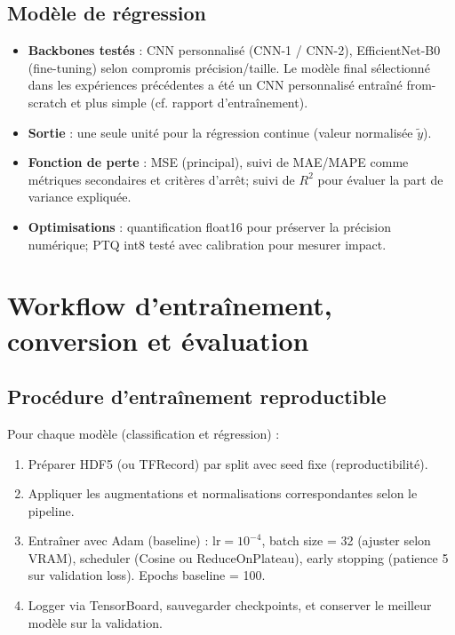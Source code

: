 \subsection{Modèle de régression}

\begin{itemize}
	\item \textbf{Backbones testés} : CNN personnalisé (CNN-1 / CNN-2), EfficientNet-B0 (fine-tuning) selon compromis précision/taille. Le modèle final sélectionné dans les expériences précédentes a été un CNN personnalisé entraîné from-scratch et plus simple (cf. rapport d'entraînement).
	\item \textbf{Sortie} : une seule unité pour la régression continue (valeur normalisée $\tilde{y}$).
	\item \textbf{Fonction de perte} : MSE (principal), suivi de MAE/MAPE comme métriques secondaires et critères d'arrêt; suivi de \(R^2\) pour évaluer la part de variance expliquée.
	\item \textbf{Optimisations} : quantification float16 pour préserver la précision numérique; PTQ int8 testé avec calibration pour mesurer impact.
\end{itemize}

\section{Workflow d'entraînement, conversion et évaluation}

\subsection{Procédure d'entraînement reproductible}

Pour chaque modèle (classification et régression) :
\begin{enumerate}
	\item Préparer HDF5 (ou TFRecord) par split avec seed fixe (reproductibilité).
	\item Appliquer les augmentations et normalisations correspondantes selon le pipeline.
	\item Entraîner avec Adam (baseline) : $\mathrm{lr}=10^{-4}$, batch size = 32 (ajuster selon VRAM), scheduler (Cosine ou ReduceOnPlateau), early stopping (patience 5 sur validation loss). Epochs baseline = 100.
	\item Logger via TensorBoard, sauvegarder checkpoints, et conserver le meilleur modèle sur la validation.
\end{enumerate}

